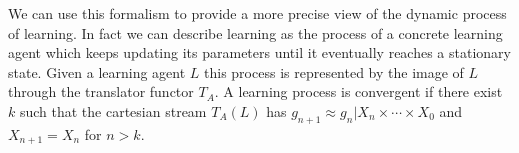 We can use this formalism to provide a more precise view of the dynamic process of learning.
In fact we can describe learning as the process of a concrete learning agent which keeps updating its parameters until it eventually reaches a stationary state. Given a learning agent $L$ this process is represented by the image of $L$ through the translator functor $T_A$. A learning process is convergent if there exist $k$ such that the cartesian stream $T_A(L)$ has $g_{n+1} \approx g_n| X_n \times \cdots \times X_0$ and $X_{n+1} = X_n$ for $n > k$.


